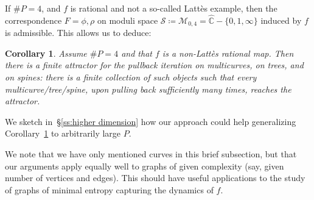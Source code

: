 \documentclass{amsart}
\newcommand\C{{\mathbb{C}}}
\newcommand{\rs}{\widehat{\C}}
\newtheorem{maincor}[mainthm]{Corollary}
\theoremstyle{definition}
\theoremstyle{remark}
\newcommand{\cS}{\mathcal{S}}
\begin{document}
If $\#P=4$, and $f$ is rational and not a so-called Latt\`es example, then the correspondence $F=\phi,\rho$ on moduli space $\cS\coloneqq\mathscr M_{0,4}=\rs - \{0,1,\infty\}$ induced by $f$ is admissible. This allows us to deduce:
\begin{maincor}\label{cor:attractor}
  Assume $\#P=4$ and that $f$ is a non-Latt\`es rational map. Then there is a finite attractor for the pullback iteration on multicurves, on trees, and on spines: there is a finite collection of such objects such that every multicurve/tree/spine, upon pulling back sufficiently many times, reaches the attractor.
\end{maincor}

We sketch in~\S\ref{ss:higher dimension} how our approach could help generalizing Corollary~\ref{cor:attractor} to arbitrarily large $P$.

We note that we have only mentioned curves in this brief subsection, but that our arguments apply equally well to graphs of given complexity (say, given number of vertices and edges). This should have useful applications to the study of graphs of minimal entropy capturing the dynamics of $f$.
\end{document}
